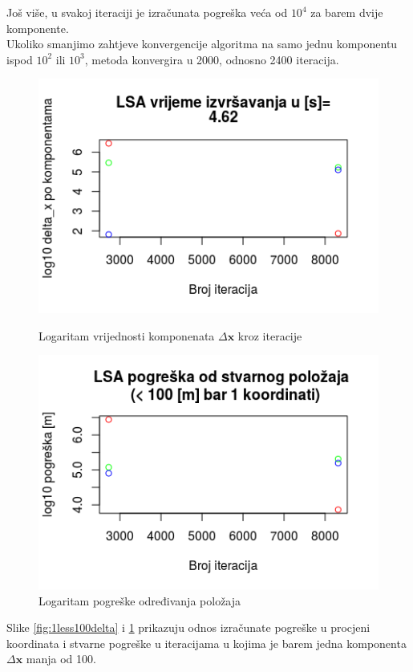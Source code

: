 \documentclass[a4paper,twoside,12pt]{memoir} %
\begin{document}
Još više, u svakoj iteraciji je izračunata pogreška veća od $10^4$ za barem dvije komponente.\\
Ukoliko smanjimo zahtjeve konvergencije algoritma na samo jednu komponentu ispod $10^2$ ili $10^3$,
metoda konvergira u 2000, odnosno 2400 iteracija. 
\begin{figure}[H]
	\begin{minipage}{0.48\textwidth}
		\centering
		\includegraphics[width=1\textwidth]{1less100delta}
		\caption{Logaritam vrijednosti komponenata $\Delta \mathbf{x}$ kroz iteracije}
		\label{fig:1less100delta}
	\end{minipage}%
	\hspace{1cm}
	\begin{minipage}{0.48\textwidth}
		\centering
		\includegraphics[width=1\textwidth]{1less100real}
		\caption{Logaritam pogreške određivanja položaja}
		\label{fig:1less100real}
	\end{minipage}%
\end{figure}
Slike \ref{fig:1less100delta} i \ref{fig:1less100real} prikazuju odnos izračunate pogreške u procjeni koordinata i stvarne pogreške u iteracijama u kojima je barem jedna komponenta $\Delta \mathbf{x}$
manja od 100.
\end{document}
